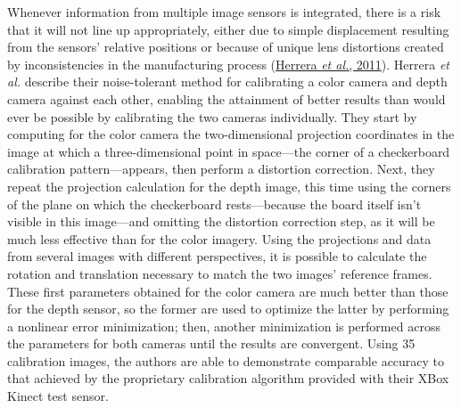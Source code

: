\documentclass[12pt]{report}
\begin{document}
Whenever information from multiple image sensors is integrated, there is a risk that it will not line up appropriately, either due to simple displacement resulting from the sensors' relative positions or because of unique lens distortions created by inconsistencies in the manufacturing process (\hyperref[bib:herrera]{Herrera \textit{et al.}, 2011}).  Herrera \textit{et al.} describe their noise-tolerant method for calibrating a color camera and depth camera against each other, enabling the attainment of better results than would ever be possible by calibrating the two cameras individually.  They start by computing for the color camera the two-dimensional projection coordinates in the image at which a three-dimensional point in space---the corner of a checkerboard calibration pattern---appears, then perform a distortion correction.  Next, they repeat the projection calculation for the depth image, this time using the corners of the plane on which the checkerboard rests---because the board itself isn't visible in this image---and omitting the distortion correction step, as it will be much less effective than for the color imagery.  Using the projections and data from several images with different perspectives, it is possible to calculate the rotation and translation necessary to match the two images' reference frames.  These first parameters obtained for the color camera are much better than those for the depth sensor, so the former are used to optimize the latter by performing a nonlinear error minimization; then, another minimization is performed across the parameters for both cameras until the results are convergent.  Using 35 calibration images, the authors are able to demonstrate comparable accuracy to that achieved by the proprietary calibration algorithm provided with their XBox Kinect test sensor.
\end{document}
